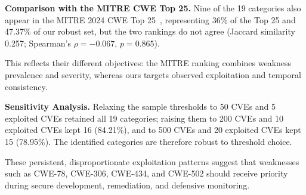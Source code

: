 \documentclass[conference,compsoc]{IEEEtran}
\begin{document}
\textbf{Comparison with the MITRE CWE Top 25.}
Nine of the 19 categories also appear in the MITRE 2024 CWE
Top 25~\cite{cwe_top25}, representing 36\% of the Top 25 and
47.37\% of our robust set, but the two rankings do not
agree (Jaccard similarity 0.257; Spearman's $\rho=-0.067$,
$p=0.865$).

This reflects their different objectives: the MITRE
ranking combines weakness prevalence and severity, whereas
ours targets observed exploitation and temporal
consistency.

\textbf{Sensitivity Analysis.}
Relaxing the sample thresholds to 50 CVEs and 5 exploited
CVEs retained all 19 categories; raising them to 200 CVEs
and 10 exploited CVEs kept 16 (84.21\%), and to 500 CVEs
and 20 exploited CVEs kept 15 (78.95\%). The identified
categories are therefore robust to threshold choice.

These persistent, disproportionate exploitation patterns
suggest that weaknesses such as CWE-78, CWE-306, CWE-434,
and CWE-502 should receive priority during secure
development, remediation, and defensive monitoring.


\end{document}
